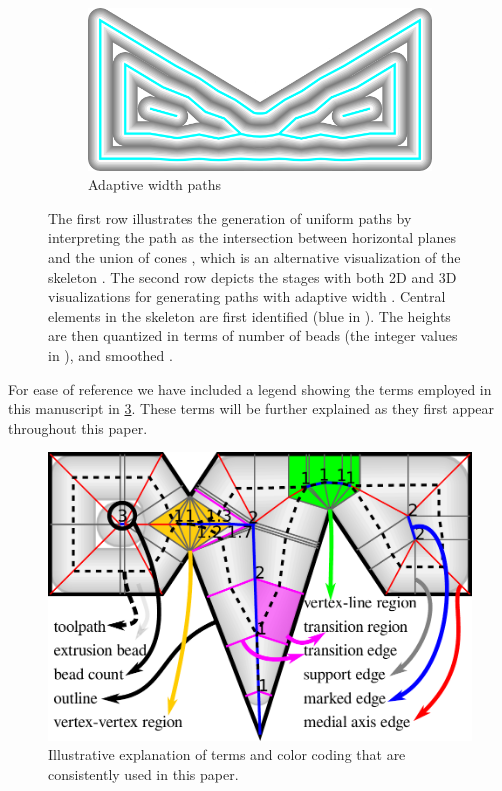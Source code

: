 \begin{figure}
\begin{subfigure}{\figwidth}
\includegraphics[width=\figheight]{sources-method-overview-2D-sliced.png}
\caption{Adaptive width paths}\label{3d_surface_overview_sliced}
\end{subfigure}
\caption{
The first row illustrates the generation of uniform paths 
by interpreting the path as the intersection between horizontal planes and the union of cones , which is an alternative visualization of the skeleton . 
The second row depicts the stages with both 2D and 3D visualizations for generating paths with adaptive width .
Central elements in the skeleton are first identified (blue in ).
The heights are then quantized in terms of number of beads (the integer values in ), and smoothed .
}
\label{3d_surface_overview}
\end{figure}

For ease of reference we have included a legend showing the terms employed in this manuscript in \cref{legend}.
These terms will be further explained as they first appear throughout this paper. 

\begin{figure}\centering
\includegraphics[width=.75\columnwidth]{sources-method-legend2.pdf}
\caption{Illustrative explanation of terms and color coding that are consistently used in this paper.}
\label{legend}
\end{figure}




















